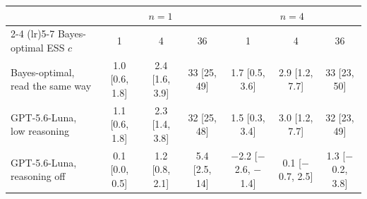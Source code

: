 \begin{tabular}{lcccccc}
\toprule
& \multicolumn{3}{c}{$n = 1$} & \multicolumn{3}{c}{$n = 4$} \\
\cmidrule(lr){2-4} \cmidrule(lr){5-7}
Bayes-optimal ESS $c$ & 1 & 4 & 36 & 1 & 4 & 36 \\
\midrule
Bayes-optimal, read the same way & 1.0 [0.6, 1.8] & 2.4 [1.6, 3.9] & 33 [25, 49] & 1.7 [0.5, 3.6] & 2.9 [1.2, 7.7] & 33 [23, 50] \\
GPT-5.6-Luna, low reasoning & 1.1 [0.6, 1.8] & 2.3 [1.4, 3.8] & 32 [25, 48] & 1.5 [0.3, 3.4] & 3.0 [1.2, 7.7] & 32 [23, 49] \\
GPT-5.6-Luna, reasoning off & 0.1 [0.0, 0.5] & 1.2 [0.8, 2.1] & 5.4 [2.5, 14] & $-$2.2 [$-$2.6, $-$1.4] & 0.1 [$-$0.7, 2.5] & 1.3 [$-$0.2, 3.8] \\
\bottomrule
\end{tabular}
